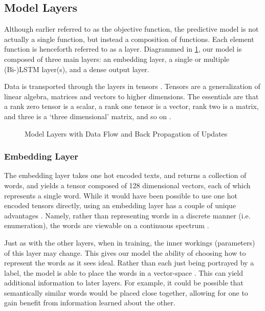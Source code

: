 \documentclass[titlepage,letterpaper]{article}
\begin{document}
\subsection{Model Layers}

Although earlier referred to as the objective function, the predictive model is not actually a single function, but instead a composition of functions. Each element function is henceforth referred to as a layer. Diagrammed in \cref{layers}, our model is composed of three main layers: an embedding layer, a single or multiple (Bi-)LSTM layer(s), and a dense output layer.

Data is transported through the layers in tensors \cite{tensorflow}. Tensors are a generalization of linear algebra, matrices and vectors to higher dimensions. The essentials are that a rank zero tensor is a scalar, a rank one tensor is a vector, rank two is a matrix, and three is a `three dimensional' matrix, and so on \cite{tensors}. 

\begin{figure}[h]
	\centering
	\label{layers}
	\def\svgwidth{3.5in}
	
	\caption{Model Layers with Data Flow and Back Propagation of Updates  \cite{knisely}} 
\end{figure}




\subsubsection{Embedding Layer}

The embedding layer takes one hot encoded texts, and returns a collection of words, and yields a tensor composed of 128 dimensional vectors, each of which represents a single word. While it would have been possible to use one hot encoded tensors directly, using an embedding layer has a couple of unique advantages \cite{Keras.io}. Namely, rather than representing words in a discrete manner (i.e. enumeration), the words are viewable on a continuous spectrum \cite{dropout_embedding}.  

Just as with the other layers, when in training, the inner workings (parameters) of this layer may change. This gives our model the ability of choosing how to represent the words as it sees ideal. Rather than each just being portrayed by a label, the model is able to place the words in a vector-space \cite{embed}. This can yield additional information to later layers. For example, it could be possible that semantically similar words would be placed close together, allowing for one to gain benefit from information learned about the other.\cite{dropout_embedding,embed}
\end{document}
